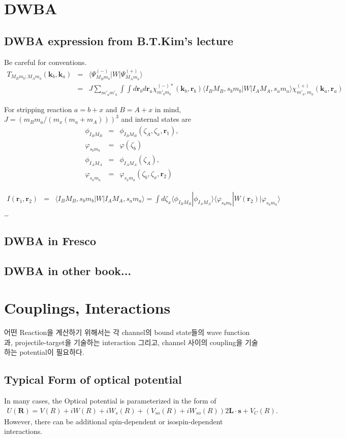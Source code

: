 \documentclass[11pt]{book}
\def\bm{\boldsymbol}
\def\vk{{\bm k}}
\def\vr{{\bm r}}
\def\vR{{\bm R}}
\def\la{\langle}
\def\ra{\rangle}
\newcommand{\bea}{\begin{eqnarray}}
\newcommand{\eea}{\end{eqnarray}}
\newcommand{\no}{\nonumber \\}
\begin{document}
\chapter{DWBA}
\section{DWBA expression from B.T.Kim's lecture}
Be careful for conventions.
\bea
T_{M_B m_b;M_A m_a}({\bm k}_b,{\bm k}_a) &=& \la \Psi^{(-)}_{M_B m_b}|W|\Psi^{(+)}_{M_A m_a}\ra \no 
 &=& J \sum_{m'_a m'_b}\int\int d\vr_b d\vr_a \chi^{(-)*}_{m'_b m_b}(\vk_b,\vr_b)
    \la I_B M_B, s_b m_b|W|I_A M_A, s_a m_a\ra \chi^{(+)}_{m'_a,m_a}(\vk_a,\vr_a)
\eea 

For stripping reaction $a=b+x$ and $B=A+x$ in mind,
$J=(m_B m_a/(m_x(m_a+m_A)))^3$ and internal states are
\bea 
\phi_{I_B M_B} &=& \phi_{I_B M_B}(\zeta_A,\zeta_x,\vr_1),\no 
\varphi_{s_b m_b} &=& \varphi(\zeta_b)\no 
\phi_{I_A M_A} &=& \phi_{I_A M_A}(\zeta_A),\no 
\varphi_{s_a m_a}&=&\varphi_{s_a m_a}(\zeta_b,\zeta_x,\vr_2)
\eea 

\bea 
I(\vr_1,\vr_2)&=& \la I_B M_B, s_b m_b|W|I_A M_A, s_a m_a\ra
      = \int d\zeta_x \la \phi_{I_B M_B}|\phi_{I_A M_A}\ra 
        \la \varphi_{s_b m_b}|W(\vr_2)|\varphi_{s_a m_a}\ra  
\eea 
\dots 

\section{DWBA in Fresco}

\section{DWBA in other book...}

\chapter{Couplings, Interactions}
어떤 Reaction을 계산하기 위해서는 각 channel의 bound state들의 wave function 과,
projectile-target을 기술하는 interaction 그리고, channel 사이의 
coupling을 기술하는 potential이 필요하다. 

\section{Typical Form of optical potential}
In many cases, the Optical potential is parameterized in the form of
\bea 
U(\vR)= V(R)+iW(R)+i W_s(R)+(V_{so}(R)+iW_{so}(R))2{\bm L}\cdot{\bm s}+V_C(R). 
\eea 
However, there can be additional spin-dependent or isospin-dependent interactions. 
\end{document}
